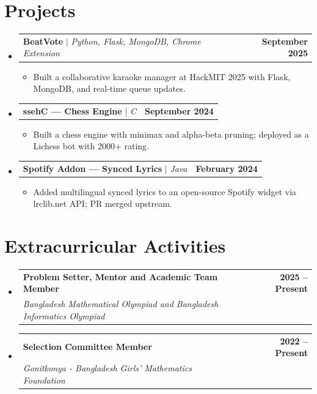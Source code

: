 \documentclass[letterpaper,11pt]{article}
\makeatletter
\newcommand{\resumeItem}[1]{
  \item{
    {#1 \vspace{-2pt}}
  }
}
\newcommand{\resumeSubheading}[4]{
  \vspace{-2pt}\item
    \begin{tabular*}{1.0\textwidth}[t]{l@{\extracolsep{\fill}}r}
      \textbf{#1} & \textbf{\small #2} \\
      \textit{\small#3} & \textit{\small #4} \\
    \end{tabular*}\vspace{-7pt}
}
\newcommand{\resumeProjectHeading}[2]{
    \vspace{-6pt}
    \item
    \begin{tabular*}{1.001\textwidth}{l@{\extracolsep{\fill}}r}
      \small#1 & \textbf{\small #2}\\
    \end{tabular*}\vspace{-10pt}
}
\newcommand{\resumeSubHeadingListStart}{\begin{itemize}[leftmargin=0.0in, label={}]}
\newcommand{\resumeSubHeadingListEnd}{\end{itemize}}
\newcommand{\resumeItemListStart}{\begin{itemize}}
\newcommand{\resumeItemListEnd}{\end{itemize}\vspace{-5pt}}
\makeatother
\begin{document}
\section{Projects}
    \resumeSubHeadingListStart
        \resumeProjectHeading
            {\textbf{BeatVote} $|$ \emph{Python, Flask, MongoDB, Chrome Extension}}{September 2025}
            \resumeItemListStart
                \resumeItem{Built a collaborative karaoke manager at HackMIT 2025 with Flask, MongoDB, and real-time queue updates.}
            \resumeItemListEnd
        \vspace{-4mm}
        \resumeProjectHeading
            {\textbf{ssehC --- Chess Engine} $|$ \emph{C}}{September 2024}
            \resumeItemListStart
                \resumeItem{Built a chess engine with minimax and alpha-beta pruning; deployed as a Lichess bot with 2000+ rating.}
            \resumeItemListEnd
        \vspace{-4mm}
        \resumeProjectHeading
            {\textbf{Spotify Addon --- Synced Lyrics} $|$ \emph{Java}}{February 2024}
            \resumeItemListStart
                \resumeItem{Added multilingual synced lyrics to an open-source Spotify widget via lrclib.net API; PR merged upstream.}
            \resumeItemListEnd
    \resumeSubHeadingListEnd

\section{Extracurricular Activities}
    \resumeSubHeadingListStart
        \resumeSubheading
            {Problem Setter, Mentor and Academic Team Member}{2025 -- Present}
            {Bangladesh Mathematical Olympiad and Bangladesh Informatics Olympiad}{}
        \resumeSubheading
            {Selection Committee Member}{2022 -- Present}
            {Gonitkonya - Bangladesh Girls' Mathematics Foundation}{}
    \resumeSubHeadingListEnd    
\end{document}
